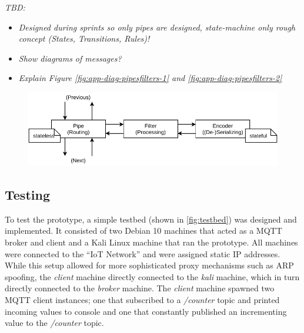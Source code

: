 \emph{TBD:}
\begin{itemize}
    \item \emph{Designed during sprints so only pipes are designed, state-machine only rough concept (States, Transitions, Rules)!}
    \item \emph{Show diagrams of messages?}
    \item \emph{Explain Figure \ref{fig:app-diag-pipesfilters-1} and \ref{fig:app-diag-pipesfilters-2}}
\end{itemize}


\begin{figure}
    \centering
    \includegraphics[width=14cm]{img/ch04/Architecture - Pipes and Filters3.pdf}
    \label{fig:design-pipes-and-filters}
\end{figure}

\subsection{Testing}
\label{sec:prototype-testing}
To test the prototype, a simple testbed (shown in \ref{fig:testbed}) was designed and implemented. It consisted of two Debian 10 machines that acted as a \ac{MQTT} broker and client and a Kali Linux machine that ran the prototype. All machines were connected to the \enquote{IoT Network} and were assigned static \ac{IP} addresses. While this setup allowed for more sophisticated proxy mechanisms such as \ac{ARP} spoofing, the \emph{client} machine directly connected to the \emph{kali} machine, which in turn directly connected to the \emph{broker} machine. The \emph{client} machine spawned two \ac{MQTT} client instances; one that subscribed to a \emph{/counter} topic and printed incoming values to console and one that constantly published an incrementing value to the \emph{/counter} topic.

